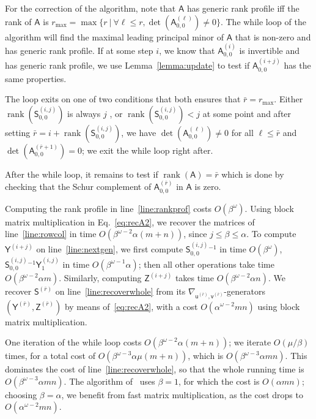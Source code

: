 \documentclass[sigconf]{acmart}
\newcommand{\vu}{\ensuremath{\mathsf{u}}}
\newcommand{\vv}{\ensuremath{\mathsf{v}}}
\newcommand{\mA}{\ensuremath{\mathsf{A}}}
\newcommand{\mS}{\ensuremath{\mathsf{S}}}
\newcommand{\mY}{\ensuremath{\mathsf{Y}}}
\newcommand{\mZ}{\ensuremath{\mathsf{Z}}}
\newcommand{\mn}{\ensuremath{\mu}}
\newcommand{\rank}{\ensuremath{\operatorname{rank}}}
\theoremstyle{acmdefinition}
\begin{document}
For the correction of the algorithm, note that $\mA$ has generic rank
profile iff the rank of $\mA$ is
$r_{\max}=\max\{ r \ |\ \forall \ell \leq r, \det(\mA^{(\ell)}_{0,0})
\neq 0 \}$.
The while loop of the algorithm will find the maximal leading
principal minor of $\mA$ that is non-zero and has generic rank
profile. If at some step $i$, we know that $\mA^{(i)}_{0,0}$ is
invertible and has generic rank profile, we use
Lemma~\ref{lemma:update} to test if $\mA^{(i+j)}_{0,0}$ has the same
properties.

The loop exits on one of two conditions that both ensures that
$\bar{r} = r_{\max}$.  Either $\rank(\mS^{(i,j)}_{0,0})$ is always $j$
, or
$\rank(\mS^{(i,j)}_{0,0})<j$ at some point and after setting
$\bar{r}=i+\rank( \mS^{(i,j)}_{0,0})$, we have
$\det(\mA^{(\ell)}_{0,0}) \neq 0$ for all $\ell \leq \bar{r}$ and
$\det(\mA^{(\bar{r}+1)}_{0,0}) = 0$; we exit the while loop right
after.

After the while loop, it remains to test if $\rank(\mA) = \bar{r}$
which is done by checking that the Schur complement of
$\mA^{(\bar{r})}_{0,0}$ in $\mA$ is zero.


Computing the rank profile
in line~\ref{line:rankprof} costs $O(\beta^\omega)$.  Using block
matrix multiplication in Eq.~\eqref{eq:recA2}, we recover the
matrices of line~\ref{line:rowcol} in time
$O(\beta^{\omega-2} \alpha (m+n))$, since $j \le \beta \le \alpha$.  To
compute $\mY^{(i+j)}$ on line~\ref{line:nextgen}, we first compute
$\mS^{(i,j)}_{0,0}{}^{-1}$ in time $O(\beta^{\omega})$,
$\mS^{(i,j)}_{0,0}{}^{-1} \mY^{(i,j)}_1$ in time
$O(\beta^{\omega-1} \alpha)$; then all other operations take time
$O(\beta^{\omega-2} \alpha m)$.  Similarly, computing $\mZ^{(i+j)}$
takes time $O(\beta^{\omega-2} \alpha n)$.  We recover  $\mS^{(\bar{r})}$ on line~\ref{line:recoverwhole} from its
$\nabla_{\vu^{(\bar{r})},\vv^{(\bar{r})}}$-generators
$(\mY^{(\bar{r})},\mZ^{(\bar{r})})$  by means
of~\eqref{eq:recA2}, with a cost $O(\alpha^{\omega-2} mn)$ using block
matrix multiplication.

One iteration of the while loop costs
$O(\beta^{\omega-2} \alpha (m+n))$; we iterate $O(\mn/\beta)$ times, for
a total cost of $O(\beta^{\omega-3} \alpha \mn(m+n))$, which is
$O(\beta^{\omega-3} \alpha mn)$. This dominates the cost of
line~\ref{line:recoverwhole}, so that the whole running time is
$O(\beta^{\omega-3} \alpha mn)$. The algorithm of~\cite{Mouilleron08}
uses $\beta=1$, for which the cost is $O(\alpha mn)$; choosing
$\beta=\alpha$, we benefit from fast matrix multiplication, as the
cost drops to $O(\alpha^{\omega-2} mn)$.
\end{document}
